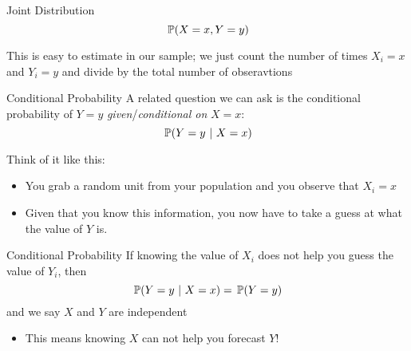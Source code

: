 \documentclass[aspectratio=169,t,11pt,table]{beamer}
\begin{document}
\begin{frame}{Joint Distribution}
  \vspace*{-\bigskipamount}
  $$\prob{X = x, Y = y}$$

  \bigskip
  This is easy to estimate in our sample; we just count the number of times $X_i = x$ and $Y_i = y$ and divide by the total number of obseravtions
\end{frame}
  
\begin{frame}{Conditional Probability}
  A related question we can ask is the \alert{conditional probability} of $Y = y$ \emph{given}/\emph{conditional on} $X = x$:
  $$
    \prob{Y = y}{X = x}
  $$
  
  \bigskip
  Think of it like this:
  \begin{itemize}
    \item You grab a random unit from your population and you observe that $X_i = x$
    \item Given that you know this information, you now have to take a guess at what the value of $Y$ is. 
  \end{itemize}
\end{frame}

\begin{frame}{Conditional Probability}
  If knowing the value of $X_i$ does not help you guess the value of $Y_i$, then
  $$
    \prob{Y = y}{X = x} = \prob{Y = y}
  $$ 
  and we say $X$ and $Y$ are \alert{independent}
  
  \begin{itemize}
    \item This means knowing $X$ can not help you forecast $Y$!
  \end{itemize}
\end{frame}
\end{document}
